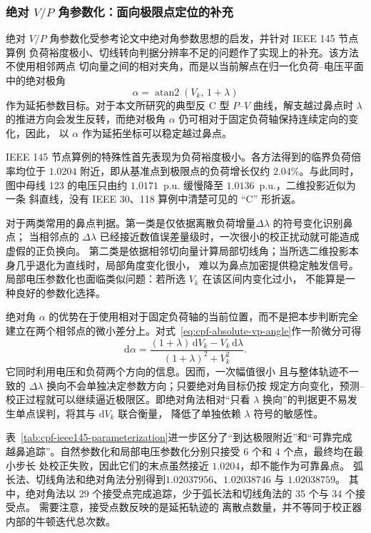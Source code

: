 \subsubsection{绝对 \texorpdfstring{$V/P$}{V/P} 角参数化：面向极限点定位的补充}

绝对 $V/P$ 角参数化受参考论文中绝对角参数思想的启发\cite{lilin2011}，并针对 IEEE 145 节点算例
负荷裕度极小、切线转向判据分辨率不足的问题作了实现上的补充。该方法不使用相邻两点
切向量之间的相对夹角，而是以当前解点在归一化负荷--电压平面中的绝对极角
\begin{equation}
  \alpha=\operatorname{atan2}\left(V_k,\,1+\lambda\right)
  \label{eq:cpf-absolute-vp-angle}
\end{equation}
作为延拓参数目标。对于本文所研究的典型反 C 型 $P$--$V$ 曲线，解支越过鼻点时
$\lambda$ 的推进方向会发生反转，而绝对极角 $\alpha$ 仍可相对于固定负荷轴保持连续定向的变化，因此，
以 $\alpha$ 作为延拓坐标可以稳定越过鼻点。

IEEE 145 节点算例的特殊性首先表现为负荷裕度极小。各方法得到的临界负荷倍率均位于
\(1.0204\) 附近，即从基准点到极限点的负荷增长仅约 \(2.04\%\)。与此同时，图中母线
123 的电压只由约 \(1.0171\)~p.u. 缓慢降至 \(1.0136\)~p.u.，二维投影近似为一条
斜直线，没有 IEEE 30、118 算例中清楚可见的 ``C'' 形折返。

对于两类常用的鼻点判据。第一类是仅依据离散负荷增量\(\Delta\lambda\) 的符号变化识别鼻点；
当相邻点的 \(\Delta\lambda\) 已经接近数值误差量级时，一次很小的校正扰动就可能造成虚假的正负换向。
第二类是依据相邻切向量计算局部切线角；当所选二维投影本身几乎退化为直线时，局部角度变化很小，
难以为鼻点加密提供稳定触发信号。局部电压参数化也面临类似问题：若所选 \(V_k\) 在该区间内变化过小，
不能算是一种良好的参数化选择。

绝对角 \(\alpha\) 的优势在于使用相对于固定负荷轴的当前位置，而不是把本步判断完全
建立在两个相邻点的微小差分上。对式~\eqref{eq:cpf-absolute-vp-angle}作一阶微分可得
\begin{equation}
  \mathrm{d}\alpha
  =
  \frac{(1+\lambda)\,\mathrm{d}V_k
        -V_k\,\mathrm{d}\lambda}
       {(1+\lambda)^2+V_k^2}.
  \label{eq:cpf-absolute-vp-angle-differential}
\end{equation}
它同时利用电压和负荷两个方向的信息。因而，一次幅值很小
且与整体轨迹不一致的 \(\Delta\lambda\) 换向不会单独决定参数方向；只要绝对角目标仍按
规定方向变化，预测--校正过程就可以继续逼近极限区。即绝对角法相对“只看
\(\lambda\) 换向”的判据更不易发生单点误判，将其与 \(\mathrm{d}V_k\) 联合衡量，
降低了单独依赖 \(\lambda\) 符号的敏感性。

表~\ref{tab:cpf-ieee145-parameterization}进一步区分了“到达极限附近”和“可靠完成
越鼻追踪”。自然参数化和局部电压参数化分别只接受 6 个和 4 个点，最终均在最小步长
处校正失败，因此它们的末点虽然接近 \(1.0204\)，却不能作为可靠鼻点。
弧长法、切线角法和绝对角法分别得到\(1.02037956\)、\(1.02038746\) 与 \(1.02038759\)。
其中，绝对角法以 29 个接受点完成追踪，少于弧长法和切线角法的 35 个与 34 个接受点。
需要注意，接受点数反映的是延拓轨迹的
离散点数量，并不等同于校正器内部的牛顿迭代总次数。

